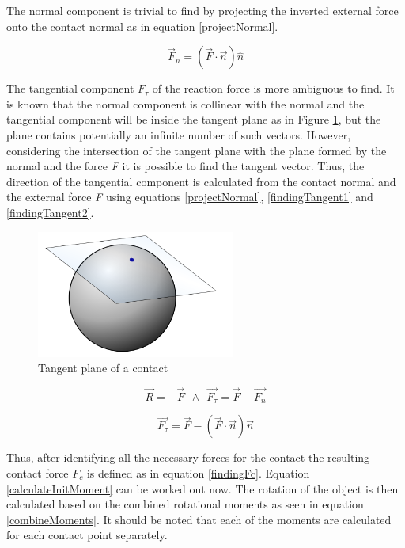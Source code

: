     The normal component is trivial to find by projecting the inverted external force onto the contact normal as in equation \ref{projectNormal}.

    \begin{equation}
    \label{projectNormal}
    \vec{F}_n = (\vec{F} \cdot \vec{n})\widehat{n}
    \end{equation}

    The tangential component $F_{\tau}$ of the reaction force is more ambiguous to find. It is known that the normal component is collinear with the normal and the tangential component will be inside the tangent plane as in Figure \ref{tangentFig}, but the plane contains potentially an infinite number of such vectors. However, considering the intersection of the tangent plane with the plane formed by the normal and the force \emph{F} it is possible to find the tangent vector. Thus, the direction of the tangential component is calculated from the contact normal and the external force \emph{F} using equations \ref{projectNormal},  \ref{findingTangent1} and \ref{findingTangent2}.

    \begin{figure}
    \begin{center}
    \includegraphics[width=65mm]{sections/methodology/images/basic/tangentspace.png}
    \caption[Tangent plane of a contact]{\label{tangentFig} Tangent plane of a contact}
    \end{center}
    \end{figure}

    \begin{equation}
    \label{findingTangent1}
    \vec{R}=-\vec{F} ~~ \wedge   ~~\vec{F_{\tau}}=\vec{F}-\vec{F_{n}}
    \end{equation}

    \begin{equation}
    \label{findingTangent2}
    \vec{F_{\tau}}=\vec{F}-(\vec{F} \cdot \vec{n})\vec n
    \end{equation}

    Thus, after identifying all the necessary forces for the contact the resulting contact force $F_c$ is defined as in equation \ref{findingFc}. Equation \ref {calculateInitMoment} can be worked out now. The rotation of the object is then calculated based on the combined rotational moments as seen in equation \ref{combineMoments}. It should be noted that each of the moments are calculated for each contact point separately.

